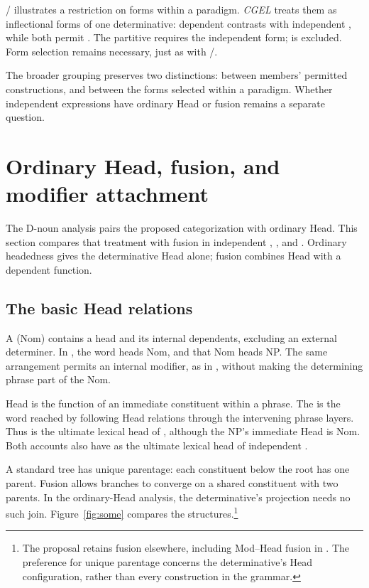 \documentclass[12pt]{article}
\begin{document}
/ illustrates a restriction on forms within a paradigm. \textit{CGEL} treats them as inflectional forms of one determinative: dependent  contrasts with independent , while both permit  \citep[389--390]{huddleston2002}. The partitive  requires the independent form;  is excluded. Form selection remains necessary, just as with /.

The broader grouping preserves two distinctions: between members' permitted constructions, and between the forms selected within a paradigm. Whether independent expressions have ordinary Head or fusion remains a separate question.

\section{Ordinary Head, fusion, and modifier attachment}\label{sec:evidence}

The D-noun analysis pairs the proposed categorization with ordinary Head. This section compares that treatment with fusion in independent , , and . Ordinary headedness gives the determinative Head alone; fusion combines Head with a dependent function.

\subsection{The basic Head relations}\label{sec:head-relations}

A  (Nom) contains a head and its internal dependents, excluding an external determiner. In , the word  heads Nom, and that Nom heads NP. The same arrangement permits an internal modifier, as in , without making the determining phrase part of the Nom.

Head is the function of an immediate constituent within a phrase. The  is the word reached by following Head relations through the intervening phrase layers. Thus  is the ultimate lexical head of , although the NP's immediate Head is Nom. Both accounts also have  as the ultimate lexical head of independent .

A standard tree has unique parentage: each constituent below the root has one parent. Fusion allows branches to converge on a shared constituent with two parents. In the ordinary-Head analysis, the determinative's projection needs no such join. Figure~\ref{fig:some} compares the structures.\footnote{The proposal retains fusion elsewhere, including Mod--Head fusion in . The preference for unique parentage concerns the determinative's Head configuration, rather than every construction in the grammar.}
\end{document}
